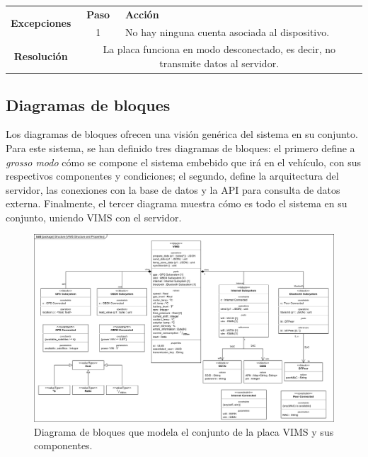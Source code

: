 \begin{table}[H]
\begin{tabularx}{\textwidth}{|c|c|X|}
    \hline
    \multirow{2}{*}{\textbf{Excepciones}}      & \textbf{Paso}                                                                                                                       & \textbf{Acción}                                                                                                                         \\
    \cline{2-3}
                                               & 1                                                                                                                                   & \multicolumn{1}{L|}{No hay ninguna cuenta asociada al dispositivo.}                                                                     \\
    \hline\hline
    \textbf{Resolución}                        & \multicolumn{2}{X|}{La placa funciona en modo desconectado, es decir, no transmite datos al servidor.}                                                                                                                                                      \\
    \hline
  \end{tabularx}
\end{table}

\subsection{Diagramas de bloques}\label{ssec:block-diagrams}

Los diagramas de bloques ofrecen una visión genérica del sistema en su conjunto. Para
este sistema, se han definido tres diagramas de bloques: el primero define a \textit{grosso modo}
cómo se compone el sistema embebido que irá en el vehículo, con sus respectivos
componentes y condiciones; el segundo, define la arquitectura del servidor, las conexiones
con la base de datos y la \ac{API} para consulta de datos externa. Finalmente, el
tercer diagrama muestra cómo es todo el sistema en su conjunto, uniendo \ac{VIMS}
con el servidor.

\begin{figure}[H]
  \centering
  \includegraphics[width=\linewidth]{images/BlockDiagrams-VIMS.drawio.png}
  \caption{Diagrama de bloques que modela el conjunto de la placa \ac{VIMS} y sus componentes.}
  \label{bd:vims}
\end{figure}

